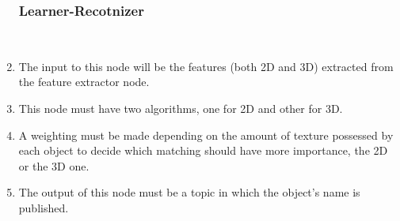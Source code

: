 \begin{enumerate}[label=\textbf{FR\threedigits*}, leftmargin=2cm]


\subsubsection{Learner-Recotnizer}
	\mbox{}\\
	\item The input to this node will be the features (both 2D and 3D) extracted from the feature extractor node. 
	\item This node must have two algorithms, one for 2D and other for 3D. 
	\mbox{}\\
	\item A weighting must be made depending on the amount of texture possessed by each object to decide which matching should have more importance, the 2D or the 3D one. 
	\item The output of this node must be a topic in which the object's name is published.
\end{enumerate}



